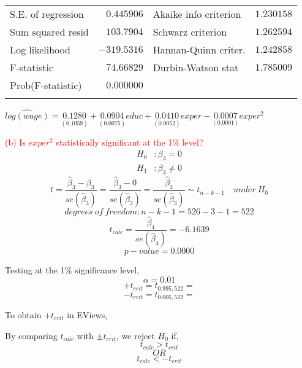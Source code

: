\documentclass[12pt]{report}
\begin{document}
\begin{table}[H]
\begin{tabular}{lrrrr}
		\multicolumn{1}{l}{S.E. of regression}&\multicolumn{1}{r}{$0.445906$}&\multicolumn{2}{l}{Akaike info criterion}&\multicolumn{1}{r}{$1.230158$}\\
		\multicolumn{1}{l}{Sum squared resid}&\multicolumn{1}{r}{$103.7904$}&\multicolumn{2}{l}{Schwarz criterion}&\multicolumn{1}{r}{$1.262594$}\\
		\multicolumn{1}{l}{Log likelihood}&\multicolumn{1}{r}{$-319.5316$}&\multicolumn{2}{l}{Hannan-Quinn criter.}&\multicolumn{1}{r}{$1.242858$}\\
		\multicolumn{1}{l}{F-statistic}&\multicolumn{1}{r}{$74.66829$}&\multicolumn{2}{l}{Durbin-Watson stat}&\multicolumn{1}{r}{$1.785009$}\\
		\multicolumn{1}{l}{Prob(F-statistic)}&\multicolumn{1}{r}{$0.000000$}&\multicolumn{1}{c}{}&\multicolumn{1}{c}{}&\multicolumn{1}{c}{}\\
		[4.5pt] \hline \\ [-4.5pt]
	\end{tabular}
\end{table}
\centering $\widehat{log(wage)} = \underset{(0.1059)}{0.1280} + \underset{(0.0075)}{0.0904}educ + \underset{(0.0052)}{0.0410}exper - \underset{(0.0001)}{0.0007}exper^2$

\justify \noindent \textcolor{red}{(b) Is $exper^2$ statistically significant at the 1\% level?}
\begin{align*}
	H_0&: \beta_3 = 0 \\
	H_1&: \beta_3 \neq 0
\end{align*}
$$t = \dfrac{\hat{\beta}_3 - \beta_{3}}{se(\hat{\beta}_3)} = \dfrac{\hat{\beta}_3 - 0}{se(\hat{\beta}_3)} = \dfrac{\hat{\beta}_3}{se(\hat{\beta}_3)} \sim t_{n-k-1} \quad under\ H_0$$
$$degrees\ of\ freedom: n-k-1 = 526-3-1 = 522$$
$$t_{calc} = \dfrac{\hat{\beta}_4}{se(\hat{\beta}_4)} = -6.1639$$
$$p-value = 0.0000$$

\newpage
\noindent Testing at the 1\% significance level,
$$\alpha = 0.01$$
$$+t_{crit} = t_{0.995,522} =$$
$$-t_{crit} = t_{0.005,522} =$$

\noindent To obtain $+t_{crit}$ in EViews,
\begin{figure}[H]
	\centering
\end{figure}
\vspace{-\baselineskip}
\begin{figure}[H]
	\centering
\end{figure}
\vspace{-\baselineskip}
\begin{figure}[H]
	\centering
\end{figure}
\vspace{-\baselineskip}
\noindent By comparing $t_{calc}$ with $\pm t_{crit}$, we reject $H_0$ if, $$t_{calc} > t_{crit}$$ $$OR$$ $$t_{calc} < -t_{crit}$$
\end{document}

